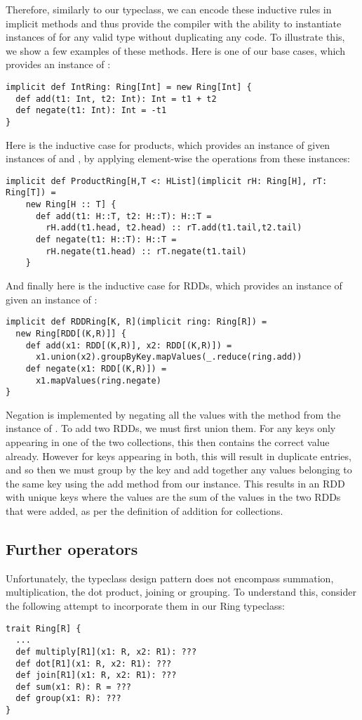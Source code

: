 Therefore, similarly to our  typeclass, we can encode these inductive rules in implicit methods and thus provide the compiler with the ability to instantiate instances of  for any valid type  without duplicating any code. To illustrate this, we show a few examples of these methods. Here is one of our base cases, which provides an instance of :
\vs\begin{lstlisting}
implicit def IntRing: Ring[Int] = new Ring[Int] {
  def add(t1: Int, t2: Int): Int = t1 + t2
  def negate(t1: Int): Int = -t1
}
\end{lstlisting}\vs
Here is the inductive case for products, which provides an instance of  given instances of  and , by applying element-wise the operations from these instances:
\vs\begin{lstlisting}
implicit def ProductRing[H,T <: HList](implicit rH: Ring[H], rT: Ring[T]) =
    new Ring[H :: T] {
      def add(t1: H::T, t2: H::T): H::T =
        rH.add(t1.head, t2.head) :: rT.add(t1.tail,t2.tail)
      def negate(t1: H::T): H::T =
        rH.negate(t1.head) :: rT.negate(t1.tail)
    }
\end{lstlisting}\vs
And finally here is the inductive case for RDDs, which provides an instance of  given an instance of :
\vs\begin{lstlisting}
implicit def RDDRing[K, R](implicit ring: Ring[R]) =
  new Ring[RDD[(K,R)]] {
    def add(x1: RDD[(K,R)], x2: RDD[(K,R)]) =
      x1.union(x2).groupByKey.mapValues(_.reduce(ring.add))
    def negate(x1: RDD[(K,R)]) =
      x1.mapValues(ring.negate)
}
\end{lstlisting}\vs
Negation is implemented by negating all the values with the method from the instance of . To add two RDDs, we must first union them. For any keys only appearing in one of the two collections, this then contains the correct value already. However for keys appearing in both, this will result in duplicate entries, and so then we must group by the key and add together any values belonging to the same key using the add method from our  instance. This results in an RDD with unique keys where the values are the sum of the values in the two RDDs that were added, as per the definition of addition for collections.

\subsection{Further operators}
Unfortunately, the typeclass design pattern does not encompass summation, multiplication, the dot product, joining or grouping. To understand this, consider the following attempt to incorporate them in our Ring typeclass:
\vs\begin{lstlisting}
trait Ring[R] {
  ...
  def multiply[R1](x1: R, x2: R1): ???
  def dot[R1](x1: R, x2: R1): ???
  def join[R1](x1: R, x2: R1): ???
  def sum(x1: R): R = ???
  def group(x1: R): ???
}
\end{lstlisting}\vs

